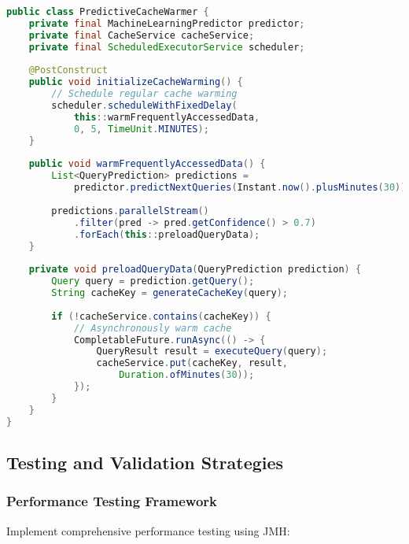 \documentclass[11pt,a4paper]{article}
\begin{document}
\begin{lstlisting}[language=Java, caption=Predictive Cache Warming]
public class PredictiveCacheWarmer {
    private final MachineLearningPredictor predictor;
    private final CacheService cacheService;
    private final ScheduledExecutorService scheduler;
    
    @PostConstruct
    public void initializeCacheWarming() {
        // Schedule regular cache warming
        scheduler.scheduleWithFixedDelay(
            this::warmFrequentlyAccessedData,
            0, 5, TimeUnit.MINUTES);
    }
    
    public void warmFrequentlyAccessedData() {
        List<QueryPrediction> predictions = 
            predictor.predictNextQueries(Instant.now().plusMinutes(30));
        
        predictions.parallelStream()
            .filter(pred -> pred.getConfidence() > 0.7)
            .forEach(this::preloadQueryData);
    }
    
    private void preloadQueryData(QueryPrediction prediction) {
        Query query = prediction.getQuery();
        String cacheKey = generateCacheKey(query);
        
        if (!cacheService.contains(cacheKey)) {
            // Asynchronously warm cache
            CompletableFuture.runAsync(() -> {
                QueryResult result = executeQuery(query);
                cacheService.put(cacheKey, result, 
                    Duration.ofMinutes(30));
            });
        }
    }
}
\end{lstlisting}

\subsection{Testing and Validation Strategies}

\subsubsection{Performance Testing Framework}

Implement comprehensive performance testing using JMH:
\end{document}
